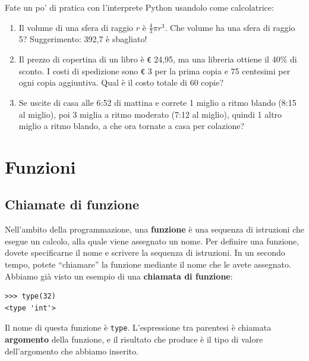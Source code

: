 \documentclass[10pt]{book}
\begin{document}
\vspace{0.2in}
\begin{exercise}

Fate un po' di pratica con l'interprete Python usandolo come calcolatrice:

\begin{enumerate}

\item Il volume di una sfera di raggio $r$ è $\frac{4}{3} \pi r^3$.
  Che volume ha una sfera di raggio 5? Suggerimento: 392,7 è sbagliato!

\item Il prezzo di copertina di un libro è \verb"€" 24,95, ma una libreria ottiene il
  40\% di sconto. I costi di spedizione sono \verb"€" 3 per la prima copia e 75 centesimi per ogni copia aggiuntiva. Qual è il costo totale di 60 copie?

\item Se uscite di casa alle 6:52 di mattina e correte 1 miglio a ritmo blando (8:15 al miglio), poi 3 miglia a ritmo moderato (7:12 al miglio), quindi 1 altro miglio a ritmo blando, a che ora tornate a casa per colazione?

\end{enumerate}
\end{exercise}


\chapter{Funzioni}
\label{funcchap}

\section{Chiamate di funzione}
\label{functionchap}

Nell'ambito della programmazione, una {\bf funzione} è una sequenza di istruzioni che esegue un calcolo, alla quale viene assegnato un nome.  Per definire una funzione, dovete specificarne il nome e scrivere la sequenza di istruzioni. In un secondo tempo, potete ``chiamare'' la funzione mediante il nome che le avete assegnato. 
Abbiamo già visto un esempio di una {\bf chiamata di funzione}:

\begin{verbatim}
>>> type(32)
<type 'int'>
\end{verbatim}
%
Il nome di questa funzione è {\tt type}. L'espressione tra parentesi è chiamata {\bf argomento} della funzione, e il risultato che produce è il tipo di valore dell'argomento che abbiamo inserito.
\end{document}
